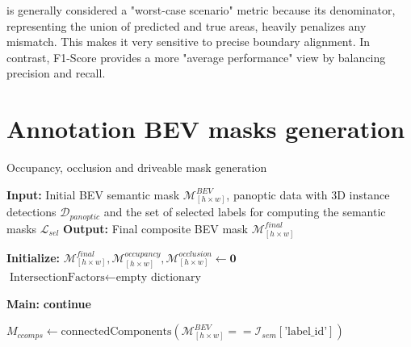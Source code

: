  is generally considered a "worst-case scenario" metric because its denominator, representing the union of predicted and true areas, heavily penalizes any mismatch. This makes it very sensitive to precise boundary alignment. In contrast, F1-Score provides a more "average performance" view by balancing precision and recall. 

\newpage


\section{Annotation BEV masks generation} \label{appendix:bev_masks_generation}
\begin{algorithm}
    \caption{Occupancy, occlusion and driveable mask generation}
    \label{algorithm:occ_masks}
    \scriptsize

    \begin{algorithmic}[1]
        \State \textbf{Input:} Initial BEV semantic mask $\mathcal{M}^{BEV}_{\left[h \times w\right]}$, panoptic data with 3D instance detections  $\mathcal{D}_{panoptic}$ and the set of selected labels for computing the semantic masks $\mathcal{L}_{sel}$
        \State \textbf{Output:} Final composite BEV mask $\mathcal{M}^{final}_{\left[h \times w\right]}$
        
        \State \textbf{Initialize:}
        \State $\mathcal{M}^{final}_{\left[h \times w\right]}, \mathcal{M}^{occupancy}_{\left[h \times w\right]}, \mathcal{M}^{occlusion}_{\left[h \times w\right]} \gets \mathbf{0}$
        \State $\text{IntersectionFactors} \gets \text{empty dictionary}$ 
        
        \State \textbf{Main:}        
                \State \textbf{continue}
            \EndIf
        
            \State $M_{ccomps} \gets \text{connectedComponents}(\mathcal{M}^{BEV}_{\left[h \times w\right]} == \mathcal{I}_{sem}[\text{'label\_id'}])$




\end{algorithmic}
\end{algorithm}
